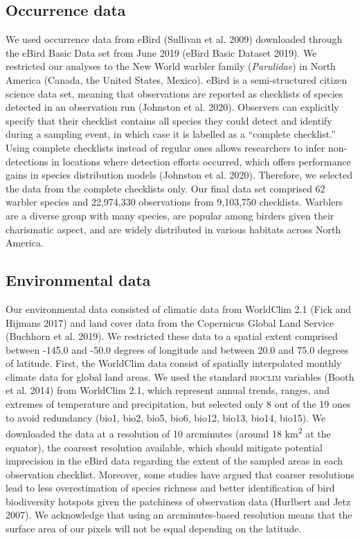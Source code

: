\documentclass[10pt,oneside]{article}
\begin{document}
\hypertarget{occurrence-data}{%
\subsection{Occurrence data}\label{occurrence-data}}

We used occurrence data from eBird (Sullivan et al. 2009) downloaded
through the eBird Basic Data set from June 2019 (eBird Basic Dataset
2019). We restricted our analyses to the New World warbler family
(\emph{Parulidae}) in North America (Canada, the United States, Mexico).
eBird is a semi-structured citizen science data set, meaning that
observations are reported as checklists of species detected in an
observation run (Johnston et al. 2020). Observers can explicitly specify
that their checklist contains all species they could detect and identify
during a sampling event, in which case it is labelled as a ``complete
checklist.'' Using complete checklists instead of regular ones allows
researchers to infer non-detections in locations where detection efforts
occurred, which offers performance gains in species distribution models
(Johnston et al. 2020). Therefore, we selected the data from the
complete checklists only. Our final data set comprised 62 warbler
species and 22,974,330 observations from 9,103,750 checklists. Warblers
are a diverse group with many species, are popular among birders given
their charismatic aspect, and are widely distributed in various habitats
across North America.

\hypertarget{environmental-data}{%
\subsection{Environmental data}\label{environmental-data}}

Our environmental data consisted of climatic data from WorldClim 2.1
(Fick and Hijmans 2017) and land cover data from the Copernicus Global
Land Service (Buchhorn et al. 2019). We restricted these data to a
spatial extent comprised between -145.0 and -50.0 degrees of longitude
and between 20.0 and 75.0 degrees of latitude. First, the WorldClim data
consist of spatially interpolated monthly climate data for global land
areas. We used the standard \textsc{bioclim} variables (Booth et al.
2014) from WorldClim 2.1, which represent annual trends, ranges, and
extremes of temperature and precipitation, but selected only 8 out of
the 19 ones to avoid redundancy (bio1, bio2, bio5, bio6, bio12, bio13,
bio14, bio15). We downloaded the data at a resolution of 10 arcminutes
(around 18 km\textsuperscript{2} at the equator), the coarsest
resolution available, which should mitigate potential imprecision in the
eBird data regarding the extent of the sampled areas in each observation
checklist. Moreover, some studies have argued that coarser resolutions
lead to less overestimation of species richness and better
identification of bird biodiversity hotspots given the patchiness of
observation data (Hurlbert and Jetz 2007). We acknowledge that using an
arcminutes-based resolution means that the surface area of our pixels
will not be equal depending on the latitude.
\end{document}
